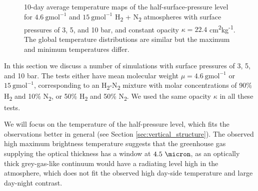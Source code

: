 \begin{figure}[t]


\caption{10-day average temperature maps of the half-surface-pressure level for $4.6\ \mathrm{gmol}^{-1}$ and $15\ \mathrm{gmol}^{-1}$ H\textsubscript{2} + N\textsubscript{2} atmospheres with surface pressures of 3, 5, and 10 bar, and constant opacity $\kappa = 22.4$ cm\textsuperscript{2}kg\textsuperscript{-1}. The global temperature distributions are similar but the maximum and minimum temperatures differ.\label{fig:H2N2_T_maps}}
\end{figure}

In this section we discuss a number of simulations with surface pressures of 3, 5, and 10 bar. The tests either have mean molecular weight $\mu = 4.6\ \mathrm{gmol}^{-1}$ or $15\ \mathrm{gmol}^{-1}$, corresponding to an H\textsubscript{2}-N\textsubscript{2} mixture with molar concentrations of 90\%  H\textsubscript{2} and 10\%   N\textsubscript{2}, or 50\%  H\textsubscript{2} and 50\%   N\textsubscript{2}. We used the same opacity $\kappa$ in all these tests.

We will focus on the temperature of the half-pressure level, which fits the observations better in general (see Section \ref{sec:vertical_structure}). The observed high maximum brightness temperature suggests that the greenhouse gas supplying the optical thickness has a window at $4.5\ \micron$, as an optically thick grey-gas-like continuum would have a radiating level high in the atmosphere, which does not fit the observed high day-side temperature and large day-night contrast.


